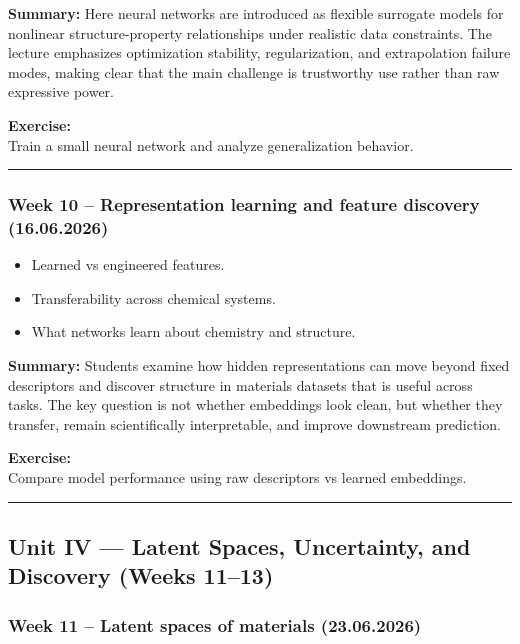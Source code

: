 \documentclass[
]{agujournal2019}
\providecommand{\tightlist}{%
  \setlength{\itemsep}{0pt}\setlength{\parskip}{0pt}}
\begin{document}
\textbf{Summary:} Here neural networks are introduced as flexible
surrogate models for nonlinear structure-property relationships under
realistic data constraints. The lecture emphasizes optimization
stability, regularization, and extrapolation failure modes, making clear
that the main challenge is trustworthy use rather than raw expressive
power.

\textbf{Exercise:}\\
Train a small neural network and analyze generalization behavior.

\begin{center}\rule{0.5\linewidth}{0.5pt}\end{center}

\subsubsection{Week 10 -- Representation learning and feature discovery
(16.06.2026)}\label{week-10-representation-learning-and-feature-discovery-16.06.2026}

\begin{itemize}
\tightlist
\item
  Learned vs engineered features.
\item
  Transferability across chemical systems.
\item
  What networks learn about chemistry and structure.
\end{itemize}

\textbf{Summary:} Students examine how hidden representations can move
beyond fixed descriptors and discover structure in materials datasets
that is useful across tasks. The key question is not whether embeddings
look clean, but whether they transfer, remain scientifically
interpretable, and improve downstream prediction.

\textbf{Exercise:}\\
Compare model performance using raw descriptors vs learned embeddings.

\begin{center}\rule{0.5\linewidth}{0.5pt}\end{center}

\subsection{Unit IV --- Latent Spaces, Uncertainty, and Discovery (Weeks
11--13)}\label{unit-iv-latent-spaces-uncertainty-and-discovery-weeks-1113}

\subsubsection{Week 11 -- Latent spaces of materials
(23.06.2026)}\label{week-11-latent-spaces-of-materials-23.06.2026}
\end{document}
